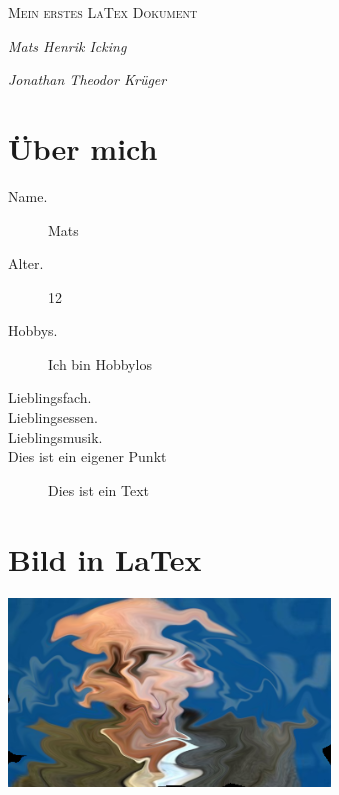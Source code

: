 \documentclass[50pt, a4paper]{article}
\begin{document}
\thispagestyle{empty}

\begin{title}
	
	\vspace{5cm}
	
	{\scshape\Huge Mein erstes LaTex Dokument \par}

	\vspace{5cm}
	{\Large\itshape Mats Henrik Icking \par}
    {\Large\itshape Jonathan Theodor Kr\"uger \par}	


\end{title}

\newpage

\tableofcontents %

\newpage

\section{\"Uber mich}

\begin{description}
\item[Name.]
 Mats 
\item[Alter.] 
12
\item[Hobbys.]
Ich bin Hobbylos
\item[Lieblingsfach.]

\item[Lieblingsessen.]

\item[Lieblingsmusik.]

\item[Dies ist ein eigener Punkt] Dies ist ein Text

\end{description}

\section{Bild in LaTex}

\includegraphics[height=50mm]{coolesBild.png}
\end{document}

